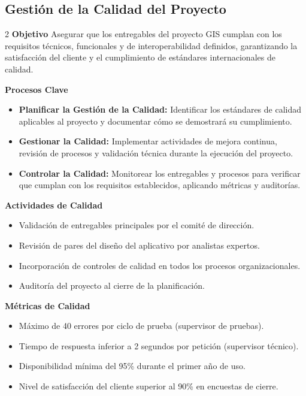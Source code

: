     \subsection{Gestión de la Calidad del Proyecto}
      \begin{multicols}{2}
        \textbf{Objetivo}
Asegurar que los entregables del proyecto GIS cumplan con los requisitos técnicos, funcionales y de interoperabilidad definidos, garantizando la satisfacción del cliente y el cumplimiento de estándares internacionales de calidad.

\textbf{Procesos Clave}
\begin{itemize}
    \item \textbf{Planificar la Gestión de la Calidad:} Identificar los estándares de calidad aplicables al proyecto y documentar cómo se demostrará su cumplimiento.
    \item \textbf{Gestionar la Calidad:} Implementar actividades de mejora continua, revisión de procesos y validación técnica durante la ejecución del proyecto.
    \item \textbf{Controlar la Calidad:} Monitorear los entregables y procesos para verificar que cumplan con los requisitos establecidos, aplicando métricas y auditorías.
\end{itemize}

\textbf{Actividades de Calidad}
\begin{itemize}
    \item Validación de entregables principales por el comité de dirección.
    \item Revisión de pares del diseño del aplicativo por analistas expertos.
    \item Incorporación de controles de calidad en todos los procesos organizacionales.
    \item Auditoría del proyecto al cierre de la planificación.
\end{itemize}

\textbf{Métricas de Calidad}
\begin{itemize}
    \item Máximo de 40 errores por ciclo de prueba (supervisor de pruebas).
    \item Tiempo de respuesta inferior a 2 segundos por petición (supervisor técnico).
    \item Disponibilidad mínima del 95\% durante el primer año de uso.
    \item Nivel de satisfacción del cliente superior al 90\% en encuestas de cierre.
\end{itemize}


\end{multicols}
